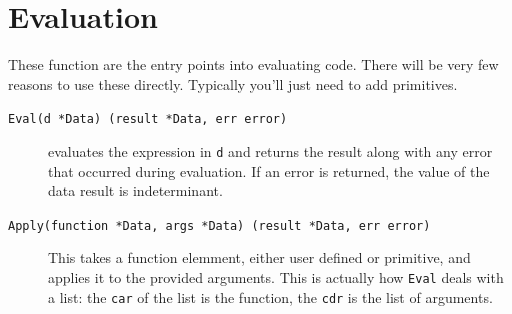 \documentclass[12pt]{article}
\begin{document}
\section{Evaluation}

These function are the entry points into evaluating code. There will be
very few reasons to use these directly. Typically you'll just need to
add primitives.

\begin{description}
\item [{\tt Eval(d *Data) (result *Data, err error)}] evaluates the
  expression in \verb|d| and returns the result along with any error
  that occurred during evaluation. If an error is returned, the value
  of the data result is indeterminant.
\item [{\tt Apply(function *Data, args *Data) (result *Data, err
  error)}]
  This takes a function elemment, either user defined or
  primitive, and applies it to the provided arguments. This is actually
  how \verb|Eval| deals with a list: the \verb|car| of the list is the
  function, the \verb|cdr| is the list of arguments.
\end{description}
\end{document}
